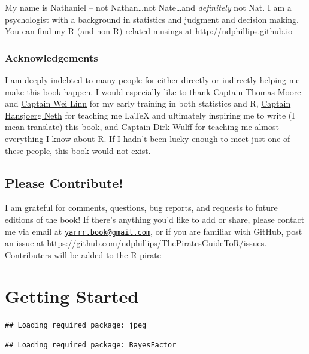 \documentclass[]{book}
\theoremstyle{definition}
\theoremstyle{definition}
\theoremstyle{remark}
\begin{document}
My name is Nathaniel -- not Nathan\ldots{}not Nate\ldots{}and
\emph{definitely} not Nat. I am a psychologist with a background in
statistics and judgment and decision making. You can find my R (and
non-R) related musings at \url{http://ndphillips.github.io}

\subsection{Acknowledgements}\label{acknowledgements}

I am deeply indebted to many people for either directly or indirectly
helping me make this book happen. I would especially like to thank
\href{https://www.grinnell.edu/users/mooret}{Captain Thomas Moore} and
\href{http://www.math.ohiou.edu/people/directory/linwei}{Captain Wei
Linn} for my early training in both statistics and R,
\href{https://www.spds.uni-konstanz.de/hans-neth}{Captain Hansjoerg
Neth} for teaching me LaTeX and ultimately inspiring me to write (I mean
translate) this book, and
\href{https://psycho.unibas.ch/fakultaet/personen/profil/person/wulff/}{Captain
Dirk Wulff} for teaching me almost everything I know about R. If I
hadn't been lucky enough to meet just one of these people, this book
would not exist.

\section{Please Contribute!}\label{please-contribute}

I am grateful for comments, questions, bug reports, and requests to
future editions of the book! If there's anything you'd like to add or
share, please contact me via email at
\href{mailto:yarrr.book@gmail.com}{\nolinkurl{yarrr.book@gmail.com}}, or
if you are familiar with GitHub, post an issue at
\url{https://github.com/ndphillips/ThePiratesGuideToR/issues}.
Contributers will be added to the R pirate

\chapter{Getting Started}\label{started}

\begin{verbatim}
## Loading required package: jpeg
\end{verbatim}

\begin{verbatim}
## Loading required package: BayesFactor
\end{verbatim}
\end{document}
